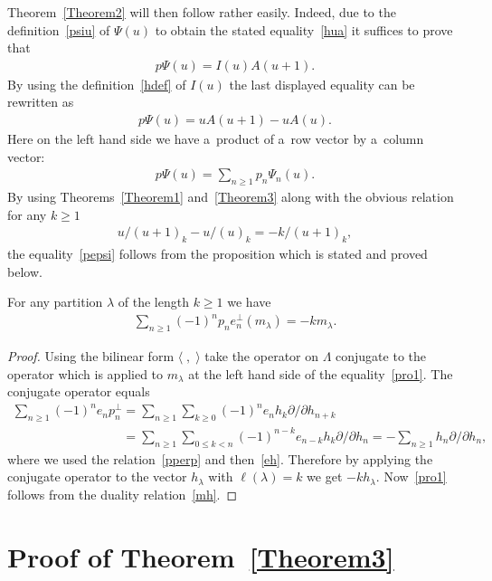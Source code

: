 \documentclass[pdftex]{sigma}
\numberwithin{equation}{section}
\renewcommand\ge{\geqslant}
\renewcommand\le{\leqslant}
\begin{document}
Theorem~\ref{Theorem2} will then follow rather easily.
Indeed, due to the def\/inition~\eqref{psiu} of $\Psi(u)$ to obtain the stated equality~\eqref{hua} it
suf\/f\/ices to prove that
\begin{gather*}%
p\Psi(u)=I(u)A(u+1).
\end{gather*}
By using the def\/inition~\eqref{hdef} of $I(u)$ the last displayed equality can be rewritten as
\begin{gather}
\label{pepsi}
p\Psi(u)=uA(u+1)-uA(u).
\end{gather}
Here on the left hand side we have a~product of a~row vector by a~column vector:
\begin{gather*}
p\Psi(u)=\sum_{n\ge1}p_n\Psi_n(u).
\end{gather*}
By using Theorems~\ref{Theorem1} and~\ref{Theorem3} along with the obvious relation for any $k\ge1$
\begin{gather*}
u/(u+1)_k-u/(u)_k=-k/(u+1)_k,
\end{gather*}
the equality~\eqref{pepsi} follows from the proposition which is
stated and proved below.
\begin{proposition}\label{Prop1}
For any partition $\lambda$ of the length $k\ge1$ we have
\begin{gather}\label{pro1}
\sum_{n\ge1}(-1)^np_ne_n^{\perp}(m_\lambda)=-km_\lambda.
\end{gather}
\end{proposition}
\begin{proof}
Using the bilinear form $\langle\;,\;\rangle$ take the operator on $\Lambda$ conjugate to the operator which
is applied to $m_\lambda$ at the left hand side of the equality~\eqref{pro1}.
The conjugate operator equals
\begin{gather*}
\sum_{n\ge1}(-1)^ne_np_n^{\perp}
=\sum_{n\ge1}\sum_{k\ge0}(-1)^ne_nh_k\partial /\partial h_{n+k}
\\
\phantom{\sum_{n\ge1}(-1)^ne_np_n^{\perp}}
=\sum_{n\ge1}\sum_{0\le k<n}(-1)^{n-k}e_{n-k}
h_k\partial /\partial h_n=-\sum_{n\ge1}h_n\partial /\partial h_n,
\end{gather*}
where we used the relation~\eqref{pperp} and then~\eqref{eh}.
Therefore by applying the conjugate operator to the vector $h_\lambda$ with $\ell(\lambda)=k$ we get
$- kh_\lambda$.
Now~\eqref{pro1} follows from the duality relation~\eqref{mh}.
\end{proof}

\section{Proof of Theorem~\ref{Theorem3}}\label{Section8}
\end{document}
